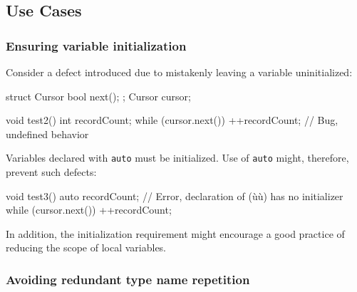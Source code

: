 \subsection[Use Cases]{Use Cases}\label{use-cases-auto}

\subsubsection[Ensuring variable initialization]{Ensuring variable initialization}\label{ensuring-variable-initialization}

Consider a defect introduced due to mistakenly leaving a variable
uninitialized:

\begin{emcppshiddenlisting}[emcppsbatch=e4]
struct Cursor {
    bool next();
};
Cursor cursor;
\end{emcppshiddenlisting}
\begin{emcppslisting}[emcppsbatch=e4]
void test2()
{
    int recordCount;
    while (cursor.next()) { ++recordCount; }  // Bug, undefined behavior
}
\end{emcppslisting}
    
\noindent Variables declared with \lstinline!auto! must be initialized. Use of
\lstinline!auto! might, therefore, prevent such defects:

\begin{emcppslisting}[emcppsbatch=e4,emcppserrorlines={4}]
void test3()
{
    auto recordCount; // Error, declaration of (ù{}ù) has no initializer
    while (cursor.next()) { ++recordCount; }
}
\end{emcppslisting}
    
\noindent In addition, the initialization requirement might encourage a good
practice of reducing the scope of local variables.

\subsubsection[Avoiding redundant type name repetition]{Avoiding redundant type name repetition}\label{avoiding-redundant-type-name-repetition}

